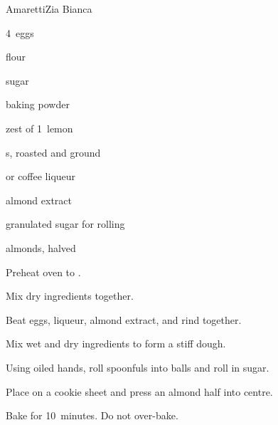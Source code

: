 \begin{recipe}{Amaretti}{Zia Bianca}{}

\begin{ingredients}
\item 4~eggs
\item {} flour
\item {} sugar
\item {} 
\item {} baking powder
\item zest of 1~lemon
\item {} s, roasted and ground
\item {}  or coffee liqueur
\item {} almond extract
\item granulated sugar for rolling
\item almonds, halved
\end{ingredients}

\begin{directions}
\item Preheat oven to .
\item Mix dry ingredients together.
\item Beat eggs, liqueur, almond extract, and rind together.
\item Mix wet and dry ingredients to form a stiff dough.
\item Using oiled hands, roll spoonfuls into balls and roll in sugar.
\item Place on a cookie sheet and press an almond half into centre.
\item Bake for 10~minutes. Do not over-bake.
\end{directions}

\end{recipe}
